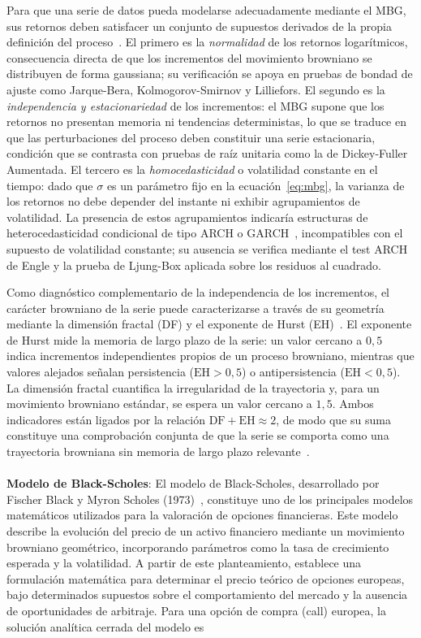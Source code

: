 \documentclass{article}
\begin{document}
Para que una serie de datos pueda modelarse adecuadamente mediante el MBG, sus retornos deben satisfacer un conjunto de supuestos derivados de la propia definición del proceso~\cite{marin2025blackscholes}. El primero es la \textit{normalidad} de los retornos logarítmicos, consecuencia directa de que los incrementos del movimiento browniano se distribuyen de forma gaussiana; su verificación se apoya en pruebas de bondad de ajuste como Jarque-Bera, Kolmogorov-Smirnov y Lilliefors. El segundo es la \textit{independencia y estacionariedad} de los incrementos: el MBG supone que los retornos no presentan memoria ni tendencias deterministas, lo que se traduce en que las perturbaciones del proceso deben constituir una serie estacionaria, condición que se contrasta con pruebas de raíz unitaria como la de Dickey-Fuller Aumentada. El tercero es la \textit{homocedasticidad} o volatilidad constante en el tiempo: dado que $\sigma$ es un parámetro fijo en la ecuación~\eqref{eq:mbg}, la varianza de los retornos no debe depender del instante ni exhibir agrupamientos de volatilidad. La presencia de estos agrupamientos indicaría estructuras de heterocedasticidad condicional de tipo ARCH o GARCH~\cite{engle1982arch, bollerslev1986garch}, incompatibles con el supuesto de volatilidad constante; su ausencia se verifica mediante el test ARCH de Engle y la prueba de Ljung-Box aplicada sobre los residuos al cuadrado.

Como diagnóstico complementario de la independencia de los incrementos, el carácter browniano de la serie puede caracterizarse a través de su geometría mediante la dimensión fractal (DF) y el exponente de Hurst (EH)~\cite{mandelbrot1983fractal, hurst1951longterm}. El exponente de Hurst mide la memoria de largo plazo de la serie: un valor cercano a $0{,}5$ indica incrementos independientes propios de un proceso browniano, mientras que valores alejados señalan persistencia ($\text{EH}>0{,}5$) o antipersistencia ($\text{EH}<0{,}5$). La dimensión fractal cuantifica la irregularidad de la trayectoria y, para un movimiento browniano estándar, se espera un valor cercano a $1{,}5$. Ambos indicadores están ligados por la relación $\text{DF}+\text{EH}\approx 2$, de modo que su suma constituye una comprobación conjunta de que la serie se comporta como una trayectoria browniana sin memoria de largo plazo relevante~\cite{mandelbrot1983fractal}.
\\
\\
\textbf{Modelo de Black-Scholes}: El modelo de Black-Scholes, desarrollado por Fischer Black y Myron Scholes (1973)~\cite{blackscholes1973}, constituye uno de los principales modelos matemáticos utilizados para la valoración de opciones financieras. Este modelo describe la evolución del precio de un activo financiero mediante un movimiento browniano geométrico, incorporando parámetros como la tasa de crecimiento esperada y la volatilidad. A partir de este planteamiento, establece una formulación matemática para determinar el precio teórico de opciones europeas, bajo determinados supuestos sobre el comportamiento del mercado y la ausencia de oportunidades de arbitraje. Para una opción de compra (call) europea, la solución analítica cerrada del modelo es~\cite{blackscholes1973, marin2025blackscholes}
\end{document}
